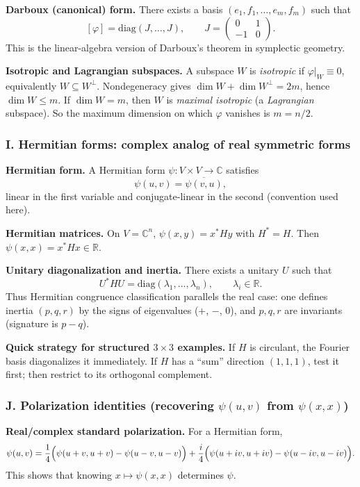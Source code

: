 \documentclass[12pt,a4paper]{article}
\theoremstyle{plain}
\theoremstyle{definition}      %
\begin{document}
\textbf{Darboux (canonical) form.}
There exists a basis $(e_1,f_1,\dots,e_m,f_m)$ such that
\[
[\varphi]=\mathrm{diag}(J,\dots,J),\qquad J=\begin{pmatrix}0&1\\-1&0\end{pmatrix}.
\]
This is the linear-algebra version of Darboux’s theorem in symplectic geometry.

\textbf{Isotropic and Lagrangian subspaces.}
A subspace $W$ is \emph{isotropic} if $\varphi|_W\equiv 0$, equivalently $W\subseteq W^\perp$.
Nondegeneracy gives $\dim W+\dim W^\perp=2m$, hence $\dim W\le m$.
If $\dim W=m$, then $W$ is \emph{maximal isotropic} (a \emph{Lagrangian} subspace).
So the maximum dimension on which $\varphi$ vanishes is $m=n/2$.

\subsubsection*{I. Hermitian forms: complex analog of real symmetric forms}

\textbf{Hermitian form.}
A Hermitian form $\psi:V\times V\to\mathbb C$ satisfies
\[
\psi(u,v)=\overline{\psi(v,u)},
\]
linear in the first variable and conjugate-linear in the second (convention used here).

\textbf{Hermitian matrices.}
On $V=\mathbb C^n$, $\psi(x,y)=x^*Hy$ with $H^*=H$.
Then $\psi(x,x)=x^*Hx\in \mathbb R$.

\textbf{Unitary diagonalization and inertia.}
There exists a unitary $U$ such that
\[
U^*HU=\mathrm{diag}(\lambda_1,\dots,\lambda_n),\qquad \lambda_i\in\mathbb R.
\]
Thus Hermitian congruence classification parallels the real case:
one defines inertia $(p,q,r)$ by the signs of eigenvalues ($+$, $-$, $0$),
and $p,q,r$ are invariants (signature is $p-q$).

\textbf{Quick strategy for structured $3\times 3$ examples.}
If $H$ is circulant, the Fourier basis diagonalizes it immediately.
If $H$ has a ``sum'' direction $(1,1,1)$, test it first; then restrict to its orthogonal complement.

\subsubsection*{J. Polarization identities (recovering $\psi(u,v)$ from $\psi(x,x)$)}

\textbf{Real/complex standard polarization.}
For a Hermitian form,
\[
\psi(u,v)=\frac14\Bigl(\psi(u+v,u+v)-\psi(u-v,u-v)\Bigr)
+\frac{i}{4}\Bigl(\psi(u+iv,u+iv)-\psi(u-iv,u-iv)\Bigr).
\]
This shows that knowing $x\mapsto \psi(x,x)$ determines $\psi$.
\end{document}
